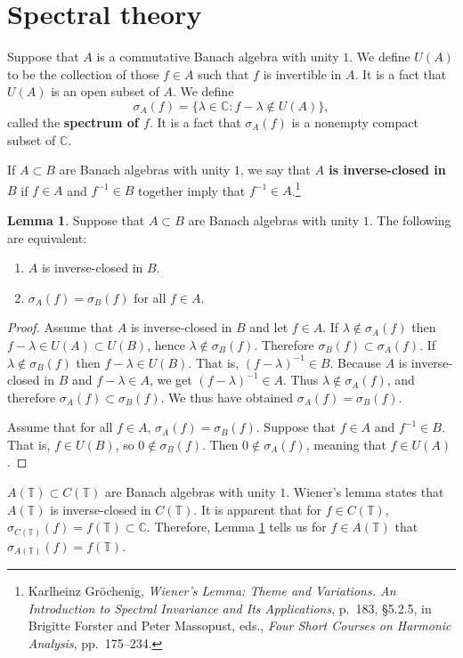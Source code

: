 \documentclass{article}
\theoremstyle{definition}
\newtheorem{lemma}[theorem]{Lemma}
\theoremstyle{definition}
\begin{document}
\section{Spectral theory}
Suppose that $A$ is a commutative Banach algebra with unity $1$. We define $U(A)$ to be the collection of 
those $f \in A$ such that $f$ is invertible in $A$. It is a fact that $U(A)$ is an open subset of $A$.  We define
\[
\sigma_A(f) = \{\lambda \in \mathbb{C}: f-\lambda \not \in U(A) \},
\]
called the \textbf{spectrum of $f$}. It is a fact that $\sigma_A(f)$ is a nonempty compact subset of $\mathbb{C}$.

If $A \subset B$ are Banach algebras with unity $1$, we say that \textbf{$A$ is inverse-closed in $B$} if
$f \in A$ and $f^{-1} \in B$ together imply that $f^{-1} \in A$.\footnote{Karlheinz Gr\"ochenig,
{\em Wiener's Lemma: Theme and Variations. An Introduction to
Spectral Invariance and Its Applications}, p.~183, \S 5.2.5, in Brigitte Forster and Peter Massopust, eds., {\em Four Short Courses on Harmonic Analysis}, pp.~175--234.}

\begin{lemma}
Suppose that $A \subset B$ are Banach algebras with unity $1$. The following are equivalent:
\begin{enumerate}
\item $A$ is inverse-closed in $B$.
\item $\sigma_A(f)=\sigma_B(f)$ for all $f \in A$. 
\end{enumerate}
\label{inverseclosed}
\end{lemma}
\begin{proof}
Assume that $A$ is inverse-closed in $B$ and let $f \in A$. If $\lambda \not \in \sigma_A(f)$ then
$f-\lambda  \in U(A) \subset U(B)$, hence $\lambda \not \in \sigma_B(f)$. Therefore
$\sigma_B(f) \subset \sigma_A(f)$. If $\lambda \not \in \sigma_B(f)$ then
$f-\lambda \in U(B)$. That is, $(f-\lambda)^{-1} \in B$. Because $A$ is inverse-closed in $B$
and $f-\lambda \in A$, we get $(f-\lambda)^{-1} \in A$. Thus $\lambda \not \in \sigma_A(f)$, and therefore
$\sigma_A(f) \subset \sigma_B(f)$. We thus have obtained $\sigma_A(f)=\sigma_B(f)$.

Assume that for all $f \in A$, $\sigma_A(f)=\sigma_B(f)$. Suppose that
$f \in A$ and $f^{-1} \in B$. That is, $f \in U(B)$, so $0 \not \in \sigma_B(f)$.
Then $0 \not \in \sigma_A(f)$, meaning that $f \in U(A)$.
\end{proof}

$A(\mathbb{T}) \subset C(\mathbb{T})$ are Banach algebras with unity $1$. 
Wiener's lemma states that $A(\mathbb{T})$ is inverse-closed in $C(\mathbb{T})$. 
It is apparent that for $f \in C(\mathbb{T})$, $\sigma_{C(\mathbb{T})}(f)=f(\mathbb{T}) \subset \mathbb{C}$.
Therefore, Lemma \ref{inverseclosed} tells us for $f \in A(\mathbb{T})$ that
$\sigma_{A(\mathbb{T})}(f)=f(\mathbb{T})$.
\end{document}
